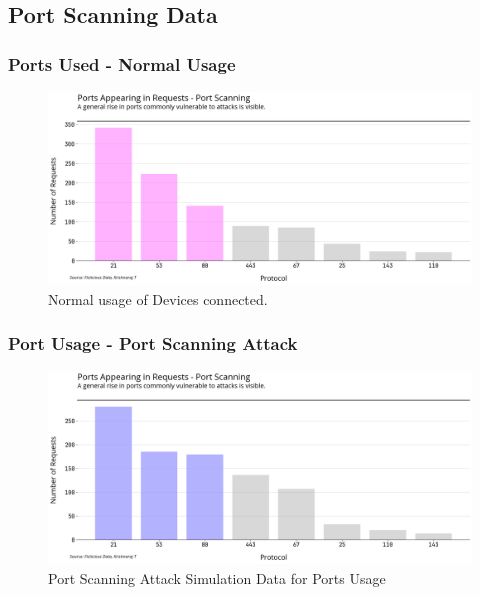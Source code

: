 \documentclass[11pt]{article}
\begin{document}
\subsection{Port Scanning Data}

\subsubsection{Ports Used - Normal Usage}
\begin{figure}[H]
    \centering
    \includegraphics[width=.95\textwidth]{router_log_analysis_graphs/normal_ports.png}
    \caption{Normal usage of Devices connected. }
\end{figure}


\subsubsection{Port Usage - Port Scanning Attack}

\begin{figure}[H]
    \centering
    \includegraphics[width=.95\textwidth]{router_log_analysis_graphs/port_scanning_ports.png}
    \caption{Port Scanning Attack Simulation Data for Ports Usage}
\end{figure}
\end{document}
